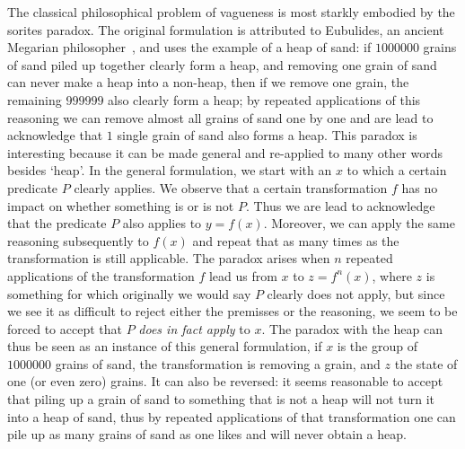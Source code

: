 \documentclass[a4paper]{article}
\begin{document}
The classical philosophical problem of vagueness is most starkly embodied by the sorites paradox.
The original formulation is attributed to Eubulides, an ancient Megarian philosopher~\parencite{sorensen_sorites_2009}, and uses the example of a heap of sand: if $1 000 000$ grains of sand piled up together clearly form a heap, and removing one grain of sand can never make a heap into a non-heap, then if we remove one grain, the remaining $999 999$ also clearly form a heap; by repeated applications of this reasoning we can remove almost all grains of sand one by one and are lead to acknowledge that $1$ single grain of sand also forms a heap.
This paradox is interesting because it can be made general and re-applied to many other words besides `heap'.
In the general formulation, we start with an $x$ to which a certain predicate $P$ clearly applies.
We observe that a certain transformation $f$ has no impact on whether something is or is not $P$.
Thus we are lead to acknowledge that the predicate $P$ also applies to $y = f(x)$.
Moreover, we can apply the same reasoning subsequently to $f(x)$ and repeat that as many times as the transformation is still applicable.
The paradox arises when $n$ repeated applications of the transformation $f$ lead us from $x$ to $z = f^n(x)$, where $z$ is something for which originally we would say $P$ clearly does not apply, but since we see it as difficult to reject either the premisses or the reasoning, we seem to be forced to accept that $P$ \emph{does in fact apply} to $x$.
The paradox with the heap can thus be seen as an instance of this general formulation, if $x$ is the group of $1 000 000$ grains of sand, the transformation is removing a grain, and $z$ the state of one (or even zero) grains.
It can also be reversed: it seems reasonable to accept that piling up a grain of sand to something that is not a heap will not turn it into a heap of sand, thus 
by repeated applications of that transformation one can pile up as many grains of sand as one likes and will never obtain a heap.
\end{document}
